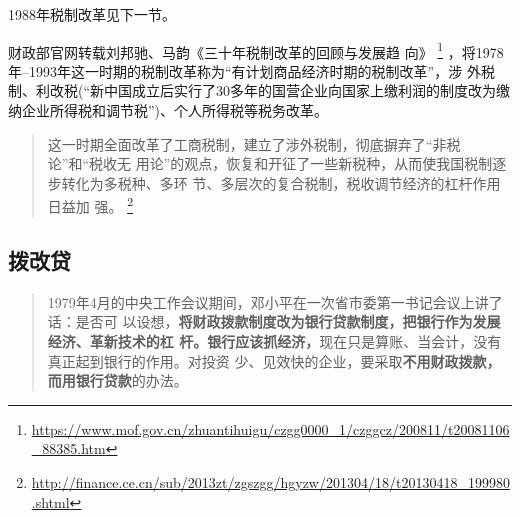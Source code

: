 1988年税制改革见下一节。

财政部官网转载刘邦驰、马韵《三十年税制改革的回顾与发展趋
向》
\footnote{\url{https://www.mof.gov.cn/zhuantihuigu/czgg0000_1/czggcz/200811/t20081106_88385.htm}}
，将1978年--1993年这一时期的税制改革称为“有计划商品经济时期的税制改革”，涉
外税制、利改税(“新中国成立后实行了30多年的国营企业向国家上缴利润的制度改为缴
纳企业所得税和调节税”)、个人所得税等税务改革。
\begin{quotation}
  这一时期全面改革了工商税制，建立了涉外税制，彻底摒弃了“非税论”和“税收无
  用论”的观点，恢复和开征了一些新税种，从而使我国税制逐步转化为多税种、多环
  节、多层次的复合税制，税收调节经济的杠杆作用日益加
  强。
  \footnote{\url{http://finance.ce.cn/sub/2013zt/zgszgg/hgyzw/201304/18/t20130418_199980.shtml}}
\end{quotation}

\subsection{拨改贷}

\begin{quotation}
  1979年4月的中央工作会议期间，邓小平在一次省市委第一书记会议上讲了话：是否可
  以设想，\textbf{将财政拨款制度改为银行贷款制度，把银行作为发展经济、革新技术的杠
    杆。银行应该抓经济，}现在只是算账、当会计，没有真正起到银行的作用。对投资
  少、见效快的企业，要采取\textbf{不用财政拨款，而用银行贷款}的办法。\cite{bogaidai30}
\end{quotation}

